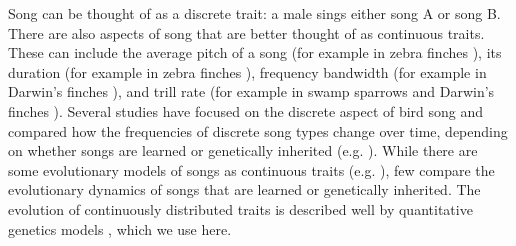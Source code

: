 \documentclass[12pt]{article}
\begin{document}
Song can be thought of as a discrete trait: a male sings either song A or song B.  There are also aspects of song that are better thought of as continuous traits. These can include the average pitch of a song (for example in zebra finches \cite{Forstmeier:2009cr}), its duration (for example in zebra finches \cite{Forstmeier:2009cr}), frequency bandwidth (for example in Darwin's finches \cite{Podos:2001vn}), and trill rate (for example in swamp sparrows \cite{Ballentine:2004kx} and Darwin's finches \cite{Podos:2001vn}). Several studies have focused on the discrete aspect of bird song and compared how the frequencies of discrete song types change over time, depending on whether songs are learned or genetically inherited (e.g. \cite{Lachlan:2004tg,Verzijden:2005vn,Yeh:2015bh}).  While there are some evolutionary models of songs as continuous traits (e.g. \cite{Aoki:2001ly}), few compare the evolutionary dynamics of songs that are learned or genetically inherited. The evolution of continuously distributed traits is described well by quantitative genetics models \cite{Lande:1980zr,Lande:1981fk,Mead:2004uq}, which we use here. 


\end{document}
